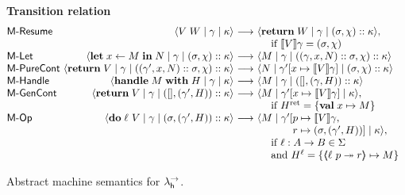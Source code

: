 \documentclass[12pt,phd,lfcs,twoside,openright,logo,leftchapter,normalheadings]{infthesis}
\theoremstyle{plain}
\theoremstyle{definition}
\begin{document}
\begin{figure*}
\raggedright

\textbf{Transition relation}
\[
  \bl
  \ba{@{}l@{~}r@{~}c@{~}l@{~~}l@{}}
\mlab{Resume} & \cek{ V\;W \mid \env \mid \kappa}
               &\stepsto& \cek{ \Return \; W \mid \env \mid (\sigma, \chi) \cons \kappa},\\
               &&&\quad\text{ if }\val{V}{\env} = (\sigma, \chi) \\

\mlab{Let} & \cek{ \Let \; x \revto M \; \In \; N \mid \env \mid (\sigma, \chi) \cons \kappa}
    &\stepsto& \cek{ M \mid \env \mid ((\env,x,N) \cons \sigma, \chi) \cons \kappa} \\

\mlab{PureCont} &\cek{ \Return \; V \mid \env \mid ((\env',x,N) \cons \sigma, \chi) \cons \kappa}
        &\stepsto& \cek{ N \mid \env'[x \mapsto \val{V}{\env}] \mid (\sigma, \chi) \cons \kappa} \\

\mlab{Handle} & \cek{ \Handle \; M \; \With \; H \mid \env \mid \kappa}
       &\stepsto& \cek{ M \mid \env \mid (\nil, (\env, H)) \cons \kappa} \\

\mlab{GenCont} & \cek{ \Return \; V \mid \env \mid (\nil, (\env',H)) \cons \kappa}
                  &\stepsto& \cek{ M \mid \env'[x \mapsto \val{V}{\env}] \mid \kappa},\\
                  &&&\quad\text{ if } \hret = \{\Val\; x \mapsto M\} \\

\mlab{Op} & \cek{ \Do \; \ell~V \mid \env \mid (\sigma, (\env', H)) \cons \kappa }
                 &\stepsto& \cek{ M \mid \env'[\bl
                                               p \mapsto \val{V}\env, \\
                                               r \mapsto (\sigma, (\env', H))] \mid \kappa }, \\
                                               \el \\
                 &&&\quad\bl
                   \text{ if } \ell : A \to B \in \Sigma\\
                   \text{ and } \hell = \{\OpCase{\ell}{p}{r} \mapsto M\}
                   \el\\
\ea
\el
\]
\caption{Abstract machine semantics for $\lambda^\rightarrow_{\mathsf{h}}$.}
\label{fig:abstract-machine-semantics-handlers}
\end{figure*}
\end{document}

